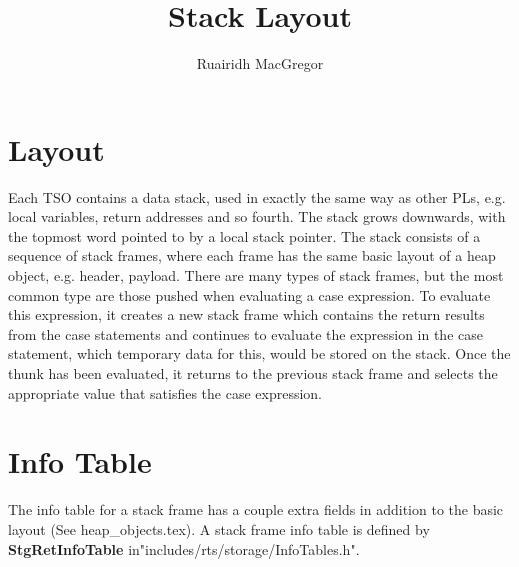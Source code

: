 \documentclass[a4paper,11pt]{article}
\title{Stack Layout}
\author{Ruairidh MacGregor}
\date{}
\begin{document}
\maketitle

\section{Layout}

Each TSO contains a data stack, used in exactly the same way as other PLs, e.g. local variables, return addresses and so fourth. The stack grows downwards, with the topmost word pointed to by a local stack pointer.
\newline\newline
The stack consists of a sequence of stack frames, where each frame has the same basic layout of a heap object, e.g. header, payload. There are many types of stack frames, but the most common type are those pushed when evaluating a case expression. To evaluate this expression, it creates a new stack frame which contains the return results from the case statements and continues to evaluate the expression in the case statement, which temporary data for this, would be stored on the stack. Once the thunk has been evaluated, it returns to the previous stack frame and selects the appropriate value that satisfies the case expression.

\section{Info Table}

The info table for a stack frame has a couple extra fields in addition to the basic layout (See heap\_objects.tex). A stack frame info table is defined by \textbf{StgRetInfoTable} in\newline"includes/rts/storage/InfoTables.h".
\end{document}
